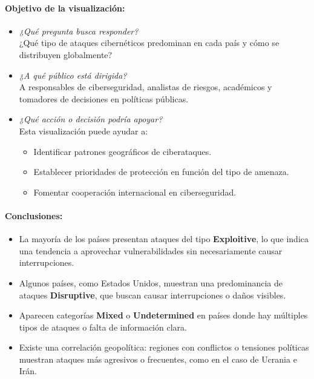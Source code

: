 \documentclass[12pt, a4paper]{article}
\begin{document}
\paragraph{Objetivo de la visualización:}

\begin{itemize}
    \item \textit{¿Qué pregunta busca responder?} \\
    ¿Qué tipo de ataques cibernéticos predominan en cada país y cómo se distribuyen globalmente?

    \item \textit{¿A qué público está dirigida?} \\
    A responsables de ciberseguridad, analistas de riesgos, académicos y tomadores de decisiones en políticas públicas.

    \item \textit{¿Qué acción o decisión podría apoyar?} \\
    Esta visualización puede ayudar a:
    \begin{itemize}
        \item Identificar patrones geográficos de ciberataques.
        \item Establecer prioridades de protección en función del tipo de amenaza.
        \item Fomentar cooperación internacional en ciberseguridad.
    \end{itemize}
\end{itemize}

\paragraph{Conclusiones:}
\begin{itemize}
    \item La mayoría de los países presentan ataques del tipo \textbf{Exploitive}, lo que indica una tendencia a aprovechar vulnerabilidades sin necesariamente causar interrupciones.
    \item Algunos países, como Estados Unidos, muestran una predominancia de ataques \textbf{Disruptive}, que buscan causar interrupciones o daños visibles.
    \item Aparecen categorías \textbf{Mixed} o \textbf{Undetermined} en países donde hay múltiples tipos de ataques o falta de información clara.
    \item Existe una correlación geopolítica: regiones con conflictos o tensiones políticas muestran ataques más agresivos o frecuentes, como en el caso de Ucrania e Irán.
\end{itemize}
\end{document}
